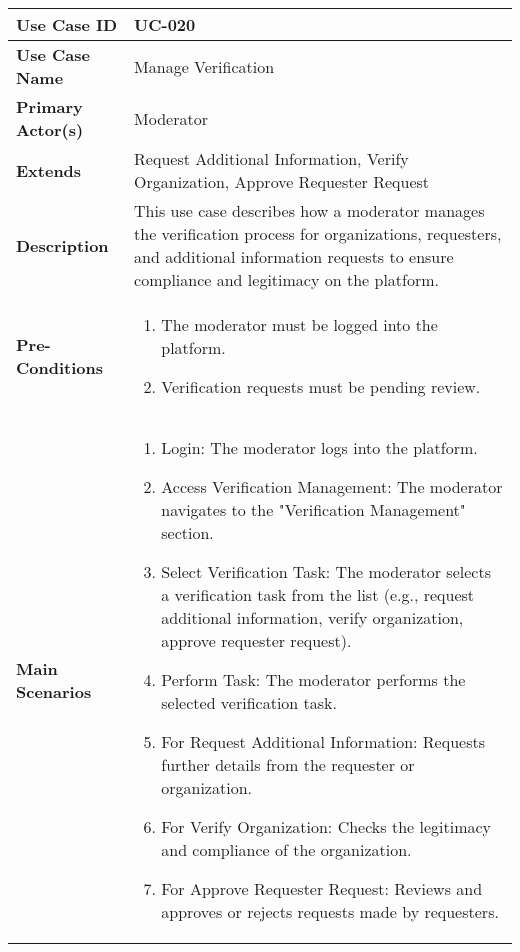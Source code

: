 \begin{table}[!ht]
    \centering
    \renewcommand{\arraystretch}{1.3} %
    \begin{tabularx}{\textwidth}{|l|X|}
        \hline
        \textbf{Use Case ID} & UC-020 \\
        \hline
        \textbf{Use Case Name} & Manage Verification \\
        \hline
        \textbf{Primary Actor(s)} & Moderator \\
        \hline
        \textbf{Extends} & Request Additional Information, Verify Organization, Approve Requester Request \\
        \hline
        \textbf{Description} & This use case describes how a moderator manages the verification process for organizations, requesters, and additional information requests to ensure compliance and legitimacy on the platform. \\
        \hline
        \textbf{Pre-Conditions} & 
        \begin{enumerate}[label=\arabic*.,itemsep=0pt]
            \item The moderator must be logged into the platform.
            \item Verification requests must be pending review.
        \end{enumerate} \\
        \hline
        \textbf{Main Scenarios} & 
        \begin{enumerate}[label=\arabic*.,itemsep=0pt]
            \item Login: The moderator logs into the platform.
            \item Access Verification Management: The moderator navigates to the "Verification Management" section.
            \item Select Verification Task: The moderator selects a verification task from the list (e.g., request additional information, verify organization, approve requester request).
            \item Perform Task: The moderator performs the selected verification task.
            \item For Request Additional Information: Requests further details from the requester or organization.
            \item For Verify Organization: Checks the legitimacy and compliance of the organization.
            \item For Approve Requester Request: Reviews and approves or rejects requests made by requesters.

\end{enumerate}
\end{tabularx}
\end{table}
